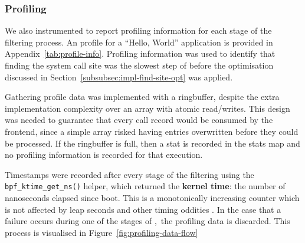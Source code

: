 \subsubsection{Profiling}

We also instrumented \af to report profiling information for each stage of the
filtering process. An profile for a ``Hello, World'' application is provided in 
Appendix~\ref{tab:profile-info}. Profiling information was used to identify that
finding the system call site was the slowest step of \af before the optimisation
discussed in Section~\ref{subsubsec:impl-find-site-opt} was applied.

Gathering profile data was implemented with a ringbuffer, despite the extra
implementation complexity over an array with atomic read/writes. This design was
needed to guarantee that every call record would be consumed by the frontend, since a 
simple array risked having entries overwritten before they could be processed.
If the ringbuffer is full, then a stat is recorded in the stats map and no
profiling information is recorded for that execution.

Timestamps were recorded after every stage of the filtering using the
\texttt{bpf\_ktime\_get\_ns()} helper, which returned the \textbf{kernel time}:
the number of nanoseconds elapsed since boot. This is a monotonically increasing
counter which is not affected by leap seconds and other timing oddities \cite{ebpf-bpf-ktime-get-ns-2025}. In the
case that a failure occurs during one of the stages of \afss,~the profiling data
is discarded. This process is visualised in Figure~\ref{fig:profiling-data-flow}


